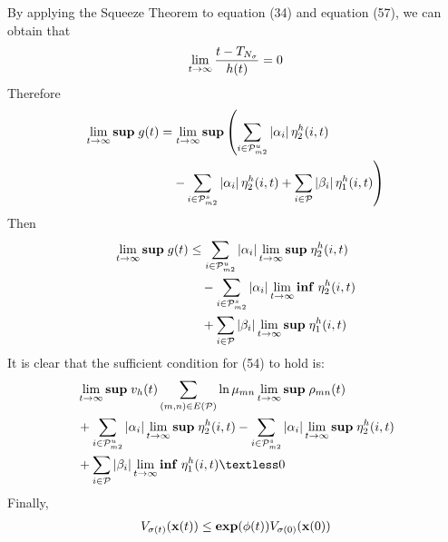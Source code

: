 \documentclass[twocolumn]{autart}    %
\begin{document}
\begin{pf}
By applying the Squeeze Theorem to equation (34) and equation (57), we can obtain that
\begin{equation}
    \begin{aligned}
        \setlength{\arraycolsep}{0.9pt}
        \lim_{t \rightarrow\infty}\frac{t-T_{N_{\sigma}}}{h(t)} = 0    
    \end{aligned}
\end{equation}
Therefore
    \begin{equation}
        \begin{aligned}
            \setlength{\arraycolsep}{0.9pt}
            \lim_{t \rightarrow \infty}\bold{sup}\;g(t)&=\lim_{t \rightarrow \infty}\bold{sup}\left(\sum_{i \in \mathcal{P}_{m2}^{u}}\left|\alpha_{i}\right|\eta_{2}^{h}(i,t)\right.\\
            & \left.\quad-\sum_{i \in \mathcal{P}_{m2}^{s}}\left|\alpha_{i}\right|\eta_{2}^{h}(i,t)+\sum_{i \in \mathcal{P}}\left|\beta_{i}\right|\eta_{1}^{h}(i,t)\right)
        \end{aligned}
    \end{equation}
    Then
    \begin{equation}
        \begin{aligned}
            \setlength{\arraycolsep}{0.9pt}
            \lim_{t \rightarrow \infty}\bold{sup}\;g(t)& \le\sum_{i \in \mathcal{P}_{m2}^{u}}\left|\alpha_{i}\right|\lim_{t \rightarrow \infty}\bold{sup}\;\eta_{2}^{h}(i,t)\\
            & \quad-\sum_{i \in \mathcal{P}_{m2}^{s}}\left|\alpha_{i}\right|\lim_{t \rightarrow \infty}\bold{inf}\;\eta_{2}^{h}(i,t)\\
            & \quad+\sum_{i \in \mathcal{P}}\left|\beta_{i}\right|\lim_{t \rightarrow \infty}\bold{sup}\;\eta_{1}^{h}(i,t)
        \end{aligned}
    \end{equation}
    It is clear that the sufficient condition for (54) to hold is:%
    \begin{equation}
        \begin{aligned}
            \setlength{\arraycolsep}{0.9pt}
            &\lim_{t \rightarrow \infty}\bold{sup}\; v_{h}(t)\sum_{(m,n) \in E(\mathcal{P})}\ln\mu_{mn}\lim_{t \rightarrow \infty}\bold{sup}\;\rho_{mn}(t)\\
            &+\sum_{i \in \mathcal{P}_{m2}^{u}}\left|\alpha_{i}\right|\lim_{t \rightarrow \infty}\bold{sup}\;\eta_{2}^{h}(i,t)-\sum_{i \in \mathcal{P}_{m2}^{s}}\left|\alpha_{i}\right|\lim_{t \rightarrow \infty}\bold{sup}\;\eta_{2}^{h}(i,t)\\
            &+\sum_{i \in \mathcal{P}}\left|\beta_{i}\right|\lim_{t \rightarrow \infty}\bold{inf}\;\eta_{1}^{h}(i,t) \textless 0
        \end{aligned}
    \end{equation}
    Finally,
    \begin{equation}
        \begin{aligned}
            \setlength{\arraycolsep}{0.9pt}
            V_{\sigma(t)}(\bold{x}(t)) \le \bold{exp}(\phi(t))V_{\sigma(0)}(\bold{x}(0))
        \end{aligned}
    \end{equation}
\end{pf}
\end{document}
